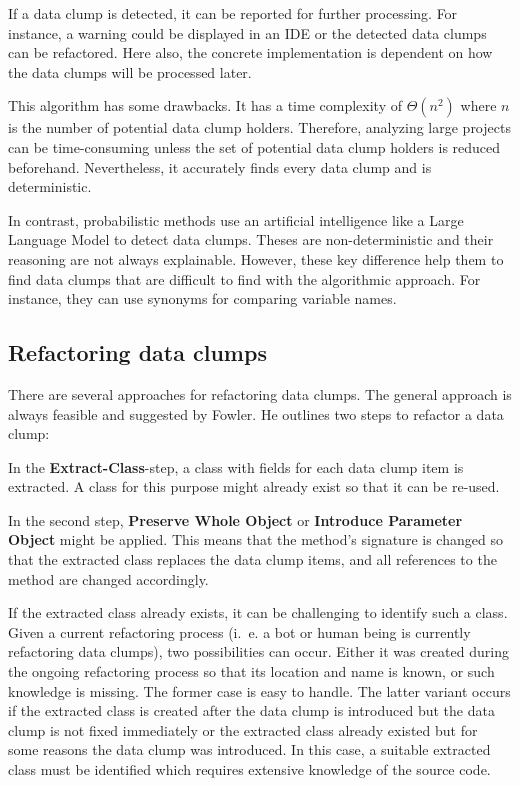 If a data clump is detected, it can be reported for further processing. For instance, a warning could be displayed in an \ac{IDE} or the detected data clumps can be refactored. Here also, the concrete implementation is dependent on how the data clumps will be processed later.

This algorithm has some drawbacks. It has a time complexity of $\Theta(n^2)$ where $n$ is the number of potential data clump holders. Therefore, analyzing  large projects can be time-consuming unless the set of potential data clump holders is reduced beforehand. Nevertheless, it accurately finds every data clump and is deterministic.

In contrast, probabilistic methods use an artificial intelligence like a Large Language Model to detect data clumps. Theses are non-deterministic and their reasoning are not always explainable. However,  these key difference help them to find data clumps that are difficult to find with the algorithmic approach. For instance, they can use synonyms for comparing variable names. 
  
\subsection{Refactoring data clumps}\label{sec:data_clump_refactor}

There are several approaches for refactoring data clumps. The general approach is always feasible and suggested by Fowler.
He outlines two  steps to refactor a data clump:

In the  \textbf{Extract-Class}-step, a class with fields for each data clump item is extracted. A class for this purpose might already exist so that it can be re-used.

In the second step, \textbf{Preserve Whole Object} or \textbf{Introduce Parameter Object} might be applied. This means that the method's signature is changed so that the extracted class replaces the data clump items, and all references to the method are changed accordingly.

If the extracted class already exists, it can be challenging to identify such a class. Given a current refactoring process (i.~e. a bot or human being is currently refactoring data clumps), two possibilities can occur. Either it was created during the ongoing refactoring process so that its location and name is known, or such knowledge is missing. The former case is easy to handle.  The latter variant occurs if the extracted class is created after the data clump is introduced but the data clump is not fixed immediately or the extracted class already existed but for some reasons the data clump was introduced. In this case, a suitable extracted class must be identified which requires extensive knowledge of the source code.

